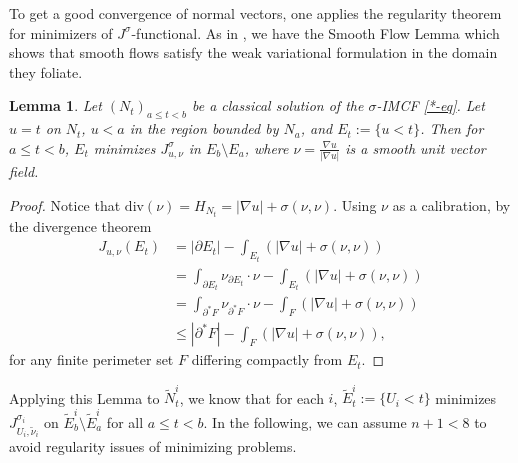 \documentclass[11pt, letterpaper]{amsart}
\newtheorem{lem}[thm]{Lemma}
\theoremstyle{definition}
\theoremstyle{remark}
\begin{document}
To get a good convergence of normal vectors, one applies the regularity theorem for minimizers of $J^{\sigma }$-functional. 
As in \cite[Lemma 2.3]{HI01}, we have the Smooth Flow Lemma which shows that smooth flows satisfy the weak variational formulation in the domain they foliate.
\begin{lem}\label{smooth-flow-lem}
	Let $(N_t)_{a \leq t < b}$ be a classical solution of the $\sigma $-IMCF \ref{*-eq}. Let $u=t$ on $N_t$, $u < a$ in the region bounded by $N_a$, and $E_t:= \{ u< t\} $. Then for $a \leq t< b$, $E_t$ minimizes $J_{u, \nu } ^{\sigma }$ in $E_{b} \setminus E_a$, where $\nu = \frac{\nabla u}{|\nabla u|}$ is a smooth unit vector field.	
\end{lem}
\begin{proof}
	Notice that $\mathrm{div}( \nu) = H_{N_t} = |\nabla u| + \sigma (\nu , \nu )$. Using $\nu $ as a calibration, by the divergence theorem
	\begin{align*}
		J_{u, \nu }(E_t) & = |\partial E_t|  - \int_{E_t} \left( |\nabla u| + \sigma (\nu ,\nu ) \right)\\
		&= \int_{\partial E_t} \nu _{\partial E_t}\cdot \nu - \int_{E_t} \left( |\nabla u| + \sigma (\nu ,\nu ) \right) \\
											   &= \int_{\partial ^* F} \nu _{\partial ^* F}\cdot \nu - \int_{ F} \left( |\nabla u| + \sigma (\nu ,\nu ) \right)\\
											   &\leq |\partial ^* F| - \int_{ F} \left( |\nabla u| + \sigma (\nu ,\nu ) \right),
	\end{align*} 
	for any finite perimeter set $F$ differing compactly from $E_t$.
\end{proof}

Applying this Lemma to $\tilde{N}^{i}_t$, we know that for each $i$, $\tilde{E}^{i}_t:=\{ U_{i} < t\} $ minimizes $J_{U_i, \tilde{\nu }_i}^{\sigma _i}$ on $\tilde{E}^{i}_{b} \setminus \tilde{E}^{i}_{a}$ for all $a \leq t< b$.  In the following, we can assume $n+1<8$ to avoid regularity issues of minimizing problems.
\end{document}
